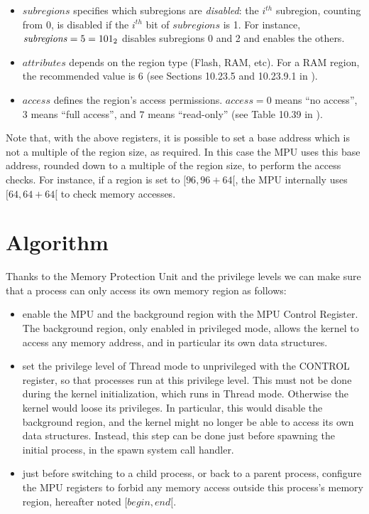 \begin{itemize}
\begin{itemize}
    \item $\mathit{subregions}$ specifies which subregions are {\em disabled}:
    the $i^{th}$ subregion, counting from 0, is disabled if the $i^{th}$ bit of
    $\mathit{subregions}$ is 1. For instance,
    $\mathit{subregions}=5=101_2$ disables subregions 0 and 2 and enables
    the others.

    \item $\mathit{attributes}$ depends on the region type (Flash, RAM, etc).
    For a RAM region, the recommended value is 6 (see Sections 10.23.5 and
    10.23.9.1 in \cite{SAM3X8E}).

    \item $\mathit{access}$ defines the region's access permissions.
    $\mathit{access}=0$ means ``no access'', $3$ means ``full access'', and $7$
    means ``read-only'' (see Table 10.39 in \cite{SAM3X8E}).
  \end{itemize}
\end{itemize}

Note that, with the above registers, it is possible to set a base address which
is not a multiple of the region size, as required. In this case the MPU uses
this base address, rounded down to a multiple of the region size, to perform
the access checks. For instance, if a region is set to $[96,96+64[$, the MPU
internally uses $[64, 64+64[$ to check memory accesses.

\section{Algorithm}

Thanks to the Memory Protection Unit and the privilege levels we can make sure
that a process can only access its own memory region as follows:
\begin{itemize}
  \item enable the MPU and the background region with the MPU Control Register.
  The background region, only enabled in privileged mode, allows the kernel to
  access any memory address, and in particular its own data structures.

  \item set the privilege level of Thread mode to unprivileged with the CONTROL
  register, so that processes run at this privilege level. This must not be
  done during the kernel initialization, which runs in Thread mode. Otherwise
  the kernel would loose its privileges. In particular, this would disable the
  background region, and the kernel might no longer be able to access its own
  data structures. Instead, this step can be done just before spawning the
  initial process, in the spawn system call handler.

  \item just before switching to a child process, or back to a parent process,
  configure the MPU registers to forbid any memory access outside this
  process's memory region, hereafter noted $[\mathit{begin},\mathit{end}[$.
\end{itemize}

